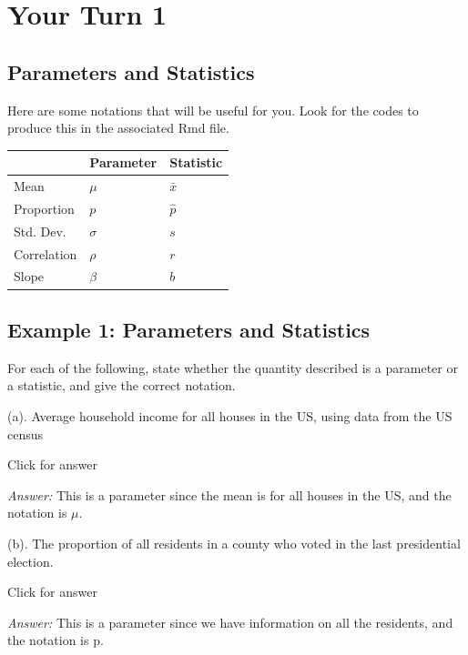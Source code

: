 \documentclass[
]{book}
\begin{document}
\hypertarget{your-turn-1-5}{%
\section{Your Turn 1}\label{your-turn-1-5}}

\hypertarget{parameters-and-statistics}{%
\subsection{Parameters and Statistics}\label{parameters-and-statistics}}

Here are some notations that will be useful for you. Look for the codes to produce this in the associated Rmd file.

\begin{longtable}[]{@{}lll@{}}
\toprule()
~ & Parameter & Statistic \\
\midrule()
\endhead
Mean & \(\mu\) & \(\bar{x}\) \\
Proportion & \(p\) & \(\hat{p}\) \\
Std. Dev. & \(\sigma\) & \(s\) \\
Correlation & \(\rho\) & \(r\) \\
Slope & \(\beta\) & \(b\) \\
\bottomrule()
\end{longtable}

\vspace*{1in}

\hypertarget{example-1-parameters-and-statistics}{%
\subsection{Example 1: Parameters and Statistics}\label{example-1-parameters-and-statistics}}

For each of the following, state whether the quantity described is a parameter or a statistic, and give the correct notation.

(a). Average household income for all houses in the US, using data from the US census

Click for answer

\emph{Answer:} This is a parameter since the mean is for all houses in the US, and the notation is \(\mu\).

(b). The proportion of all residents in a county who voted in the last presidential election.

Click for answer

\emph{Answer:} This is a parameter since we have information on all the residents, and the notation is p.
\end{document}

